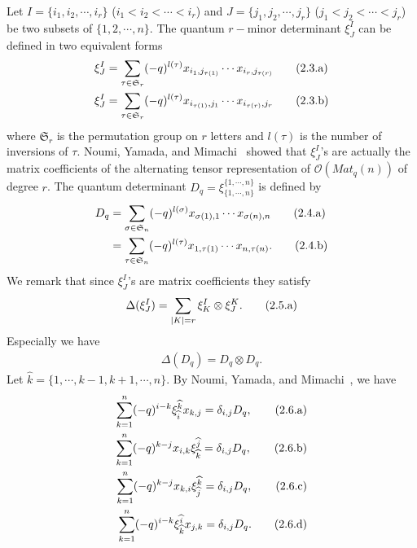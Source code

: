 \documentclass[table,a4paper,reqno]{amsart}
\numberwithin{equation}{section}
\theoremstyle{definition}
\begin{document}
Let $I=\{i_1,i_2,\cdots,i_r\}$ ($i_1<i_2<\cdots<i_r$) and $J=\{j_1,j_2,\cdots,j_r\}$ ($j_1<j_2<\cdots<j_r$) be two subsets of $\{1,2,\cdots,n\}$. The quantum $r-$minor determinant $\xi_J^I$ can be defined in two equivalent forms
\begin{align}\stepcounter{equation}
    \xi_J^I&=\sum_{\tau\in\mathfrak{S}_r}(-q)^{l(\tau)}x_{i_1,j_{\tau(1)}}\cdots x_{i_r,j_{\tau(r)}}\tag{2.3.a}\label{eq:2.3.a}\\
    \xi_J^I&=\sum_{\tau\in\mathfrak{S}_r}(-q)^{l(\tau)}x_{i_{\tau(1)},j_1}\cdots x_{i_{\tau(r)},j_r}\tag{2.3.b}\label{eq:2.3.b}
\end{align}
where $\mathfrak{S}_r$ is the permutation group on $r$ letters and $l(\tau)$ is the number of inversions of $\tau$. Noumi, Yamada, and Mimachi~\cite{noumi1993finite} showed that $\xi_J^I$'s are actually the matrix coefficients of the alternating tensor representation of $\mathcal{O}(Mat_q(n))$ of degree $r$. The quantum determinant $D_q=\xi_{\{1,\cdots,n\}}^{\{1,\cdots,n\}}$ is defined by
\begin{align}\stepcounter{equation}
    D_q&=\sum_{\sigma\in\mathfrak{S}_n}(-q)^{l(\sigma)}x_{\sigma(1),1}\cdots x_{\sigma(n),n}\tag{2.4.a}\label{2.4.a}\\
    &=\sum_{\tau\in\mathfrak{S}_n}(-q)^{l(\tau)}x_{1,\tau(1)}\cdots x_{n,\tau(n)}.\tag{2.4.b}\label{eq:2.4.b}
\end{align}
We remark that since $\xi_J^I$'s are matrix coefficients they satisfy
\begin{align}\stepcounter{equation}
    \Delta(\xi_J^I)=\sum_{|K|=r}\xi_K^I\otimes \xi_J^K.\tag{2.5.a}\label{eq:2.5.a}
\end{align}
Especially we have
\begin{align}
    \Delta(D_q)=D_q\otimes D_q. \tag{2.5.b}\label{eq:2.5.b}
\end{align}
Let $\widehat{k}=\{1,\cdots,k-1,k+1,\cdots,n\}$. By Noumi, Yamada, and Mimachi~\cite{noumi1993finite}, we have
\begin{align}\stepcounter{equation}
    \sum_{k=1}^n(-q)^{i-k}\xi_{\widehat{i}}^{\widehat{k}}x_{k,j}=\delta_{i,j}D_q,\tag{2.6.a}\label{eq:2.6.a}\\
    \sum_{k=1}^n(-q)^{k-j}x_{i,k}\xi^{\widehat{j}}_{\widehat{k}}=\delta_{i,j}D_q,\tag{2.6.b}\label{eq:2.6.b}\\
    \sum_{k=1}^n(-q)^{k-j}x_{k,i}\xi_{\widehat{j}}^{\widehat{k}}=\delta_{i,j}D_q,\tag{2.6.c}\label{eq:2.6.c}\\
    \sum_{k=1}^n(-q)^{i-k}\xi^{\widehat{i}}_{\widehat{k}}x_{j,k}=\delta_{i,j}D_q.\tag{2.6.d}\label{eq:2.6.d}
\end{align}
\end{document}

